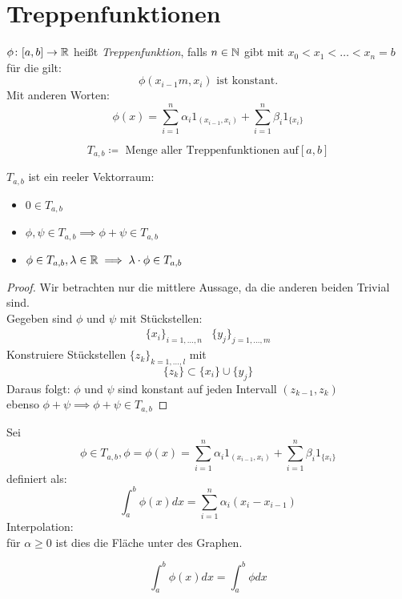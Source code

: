 \section{Treppenfunktionen}
\begin{definition}[Treppenfunktion]
	$\phi \colon [a,b] \to \mathbb{R} $ heißt \emph{Treppenfunktion}, falls $n \in \mathbb{N}$ gibt mit $x_0 < x_1 < \ldots < x_{n}=b$ für die gilt:
	\[
	\phi(x_{i-1}m,x_{i}) \text{ ist konstant.}
	\]
	Mit anderen Worten:
	\[
		\phi(x) = \sum_{i=1}^{n} \alpha_i 1_{(x_{i-1},x_{i})} + \sum_{i=1}^{n} \beta_i 1_{\{x_{i}\} }
	\]
\end{definition}
\begin{notation}
\[
	T_{a,b} \coloneqq \text{ Menge aller Treppenfunktionen auf} [a,b]
\]
\end{notation}
\begin{lemma}
	$T_{a,b}$ ist ein reeler Vektorraum:
	\begin{itemize}
		\item $0 \in T_{a,b}$ 
		\item $\phi, \psi \in T_{a,b} \implies \phi + \psi \in T_{a,b}$
		\item $\phi \in T_{a,b}, \lambda \in \mathbb{R} \implies \lambda \cdot \phi \in T_{a,b}$ 
	\end{itemize}

\end{lemma}
\begin{proof}
Wir betrachten nur die mittlere Aussage, da die anderen beiden Trivial sind. \\

Gegeben sind $\phi$ und $\psi$ mit Stückstellen:
\begin{align*}
	\{x_i\}_{i=1,\ldots,n} & \{y_{j}\} _{j=1,\ldots,m}
\end{align*}
Konstruiere Stückstellen $\{z_k\}_{k=1,\ldots,l}$ mit
\[
\{z_k\} \subset \{x_{i}\} \cup \{y_{j}\} 
\]
Daraus folgt:
$\phi$ und $\psi$ sind konstant auf jeden Intervall $(z_{k-1}, z_k)$ \\ ebenso $\phi + \psi \implies \phi + \psi \in T_{a,b}$  
\end{proof}
\begin{definition}
Sei  \[\phi \in T_{a,b}, \phi = \phi(x) = \sum_{i=1}^{n} \alpha_i 1_{(x_{i-1},x_{i})} + \sum_{i=1}^{n} \beta_i 1_{\{x_{i}\} } \] definiert als:
	\[
		\int_{a}^{b} \phi(x) dx = \sum_{i=1}^{n}\alpha_i (x_{i}-x_{i-1})
	\]
Interpolation: \\
für $\alpha \ge 0$ ist dies die Fläche unter des Graphen. 
\end{definition}
\begin{notation}
\[
\int_a^b \phi(x)dx= \int_a^b \phi dx
\]
\end{notation}

